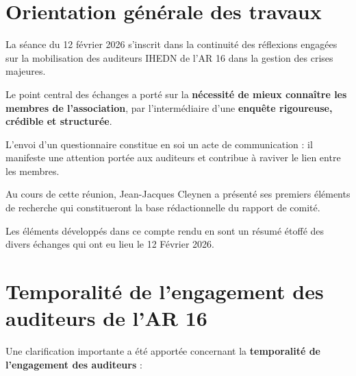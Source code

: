 \documentclass[12pt,a4paper]{article}
\begin{document}

\section*{Orientation générale des travaux}

La séance du 12 février 2026 s'inscrit dans la continuité des réflexions engagées sur la mobilisation des auditeurs IHEDN de l'AR 16  dans la gestion des crises majeures.

Le point central des échanges a porté sur la \textbf{nécessité de mieux connaître les membres de l'association}, par l'intermédiaire d'une \textbf{enquête rigoureuse, crédible et structurée}.

L'envoi d'un questionnaire constitue en soi un acte de communication : il manifeste une attention portée aux auditeurs et contribue à raviver le lien entre les membres.

Au cours de cette réunion, Jean-Jacques Cleynen a présenté ses premiers éléments de recherche qui constitueront la base rédactionnelle du rapport de comité.

Les éléments développés dans ce compte rendu en sont un résumé étoffé des divers échanges qui ont eu lieu le 12 Février 2026.

\section*{Temporalité de l'engagement des auditeurs de l'AR 16}

Une clarification importante a été apportée concernant la \textbf{temporalité de l'engagement des auditeurs} :
\end{document}
